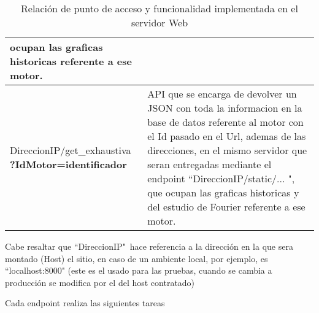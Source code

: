 \begin{table}[ht]
\begin{center}
\begin{tabular}{|p{5cm}|p{10cm}|}
                ocupan las graficas historicas referente a ese motor.
                \\\hline
                DireccionIP/get\_exhaustiva \textbf{?IdMotor=identificador}&
                API que se encarga de devolver un JSON con toda la informacion
                en la base de datos referente al motor con el Id pasado en el
                Url, ademas de las direcciones, en el mismo servidor que seran
                entregadas mediante el endpoint ``DireccionIP/static/... ", que
                ocupan las graficas historicas y del estudio de Fourier
                referente a ese motor.
                \\\hline
            \end{tabular}

            \vspace{0.3cm}
            Cabe resaltar que ``DireccionIP"\ hace referencia a la dirección en la
            que sera montado (Host) el sitio, en caso de un ambiente local, por
            ejemplo, es ``localhost:8000" (este es el usado para las pruebas,
            cuando se cambia a producción se modifica por el del host contratado)
        \end{center}
        \caption[Funciones Servidor Web]{ Relación de punto de acceso y
        funcionalidad implementada en el servidor Web }
        \label{tab:serWeb}
    \end{table}

    Cada endpoint realiza las siguientes tareas


